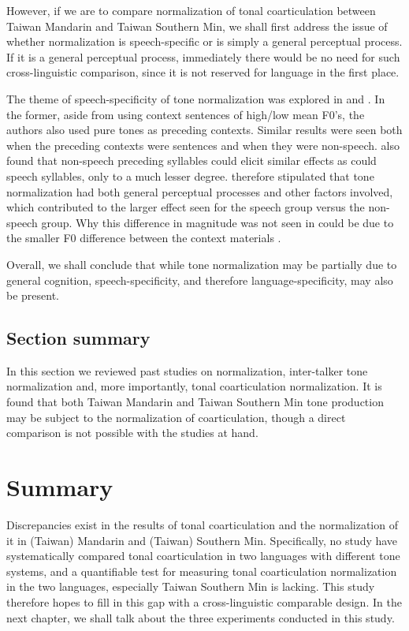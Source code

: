 \documentclass[12pt]{report}
\begin{document}
\begin{CJK}{UTF8}{bsmi}
However, if we are to compare normalization of tonal coarticulation between Taiwan Mandarin and Taiwan Southern Min, we shall first address the issue of whether normalization is speech-specific or is simply a general perceptual process. If it is a general perceptual process, immediately there would be no need for such cross-linguistic comparison, since it is not reserved for language in the first place.

The theme of speech-specificity of tone normalization was explored in \cite{HuangHolt2009} and \cite{Zhangetal2022}. In the former, aside from using context sentences of high/low mean F0's, the authors also used pure tones as preceding contexts. Similar results were seen both when the preceding contexts were sentences and when they were non-speech. \cite{Zhangetal2022} also found that non-speech preceding syllables could elicit similar effects as could speech syllables, only to a much lesser degree. \cite{Zhangetal2022} therefore stipulated that tone normalization had both general perceptual processes and other factors involved, which contributed to the larger effect seen for the speech group versus the non-speech group. Why this difference in magnitude was not seen in \cite{HuangHolt2009} could be due to the smaller F0 difference between the context materials \citep{Zhangetal2022}.

Overall, we shall conclude that while tone normalization may be partially due to general cognition, speech-specificity, and therefore language-specificity, may also be present.

\subsection{Section summary}
In this section we reviewed past studies on normalization, inter-talker tone normalization and, more importantly, tonal coarticulation normalization. It is found that both Taiwan Mandarin and Taiwan Southern Min tone production may be subject to the normalization of coarticulation, though a direct comparison is not possible with the studies at hand.

\section{Summary}
Discrepancies exist in the results of tonal coarticulation and the normalization of it in (Taiwan) Mandarin and (Taiwan) Southern Min. Specifically, no study have systematically compared tonal coarticulation in two languages with different tone systems, and a quantifiable test for measuring tonal coarticulation normalization in the two languages, especially Taiwan Southern Min is lacking. This study therefore hopes to fill in this gap with a cross-linguistic comparable design. In the next chapter, we shall talk about the three experiments conducted in this study.


\end{CJK}
\end{document}
